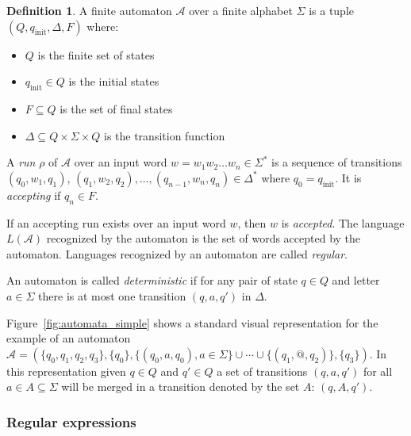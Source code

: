 \documentclass[12px]{article}
\theoremstyle{definition}
\newtheorem{definition}{Definition}
\begin{document}
      \begin{definition}
        A finite automaton $\mathcal{A}$ over a finite alphabet $\Sigma$ is a
        tuple $(Q, q_\text{init}, \Delta, F)$ where:
          \begin{itemize}
            \item $Q$ is the finite set of states
            \item $q_\text{init} \in Q$ is the initial states
            \item $F \subseteq Q$ is the set of final states
            \item $\Delta \subseteq Q \times \Sigma \times Q$ is the transition
              function
          \end{itemize}

          A \textit{run} $\rho$ of $\mathcal{A}$ over an input word $w= w_1 w_2
          \ldots w_n \in \Sigma^*$ is a sequence of transitions $(q_0, w_1,
          q_1)$, $(q_1, w_2, q_2), \ldots, (q_{n-1}, w_n, q_n) \in \Delta^*$
          where $q_0 = q_\text{init}$. It is \textit{accepting} if $q_n \in F$.

          If an accepting run exists over an input word $w$, then $w$ is
          \textit{accepted}. The language $L(\mathcal{A})$ recognized by the
          automaton is the set of words accepted by the automaton. Languages
          recognized by an automaton are called \textit{regular}.

          An automaton is called \textit{deterministic} if for any pair of
          state $q \in Q$ and letter $a \in \Sigma$ there is at most one
          transition $(q, a, q')$ in $\Delta$.
        \end{definition}

        Figure~\ref{fig:automata_simple} shows a standard visual representation
        for the example of an automaton $\mathcal{A} = (\{q_0, q_1, q_2, q_3\},
        \{q_0\}, \{(q_0, a, q_0), a \in \Sigma\} \cup \cdots \cup \{(q_1,
        \texttt{@}, q_2)\},\{q_3\})$. In this representation given $q \in Q$
        and $q' \in Q$ a set of transitions $(q, a, q')$ for all $a \in A
        \subseteq \Sigma$ will be merged in a transition denoted by the set
        $A$: $(q, A, q')$.

      \subsubsection{Regular expressions}%
        \label{sec:def:regex}
\end{document}
